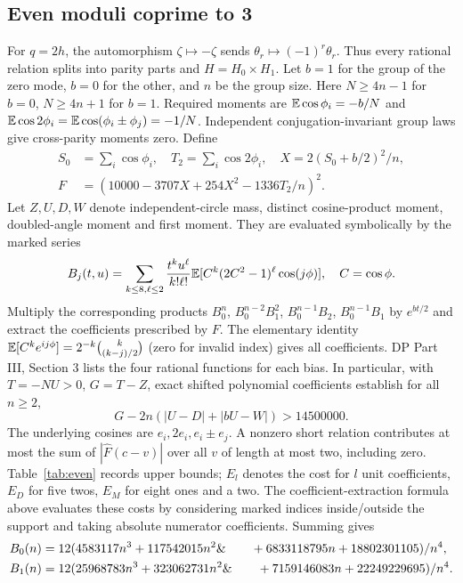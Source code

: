 \documentclass[11pt]{article}
\begin{document}
\subsection{Even moduli coprime to 3}
For $q=2h$, the automorphism $\zeta\mapsto-\zeta$ sends $\theta_r\mapsto(-1)^r\theta_r$. Thus every rational relation splits into parity parts and $H=H_0\times H_1$. Let $b=1$ for the group of the zero mode, $b=0$ for the other, and $n$ be the group size. Here $N\ge4n-1$ for $b=0$, $N\ge4n+1$ for $b=1$. Required moments are $\mathbb E\cos\phi_i=-b/N$ and $\mathbb E\cos2\phi_i=\mathbb E\cos(\phi_i\pm\phi_j)=-1/N$. Independent conjugation-invariant group laws give cross-parity moments zero. Define
\begin{align}S_0&=\sum_i\cos\phi_i,\quad T_2=\sum_i\cos2\phi_i,\quad X=2(S_0+b/2)^2/n,\\F&=(10000-3707X+254X^2-1336T_2/n)^2.\end{align}
Let $Z,U,D,W$ denote independent-circle mass, distinct cosine-product moment, doubled-angle moment and first moment. They are evaluated symbolically by the marked series
\[B_j(t,u)=\sum_{k\le8,\ell\le2}\frac{t^ku^\ell}{k!\ell!}\mathbb E[C^k(2C^2-1)^\ell\cos(j\phi)],\quad C=\cos\phi.\]
Multiply the corresponding products $B_0^n$, $B_0^{n-2}B_1^2$, $B_0^{n-1}B_2$, $B_0^{n-1}B_1$ by $e^{bt/2}$ and extract the coefficients prescribed by $F$. The elementary identity $\mathbb E[C^ke^{ij\phi}]=2^{-k}\binom{k}{(k-j)/2}$ (zero for invalid index) gives all coefficients. DP Part III, Section 3 lists the four rational functions for each bias. In particular, with $T=-NU>0$, $G=T-Z$, exact shifted polynomial coefficients establish for all $n\ge2$,
\begin{equation}\label{eq:evenbase}G-2n(|U-D|+|bU-W|)>14500000.\end{equation}
The underlying cosines are $e_i,2e_i,e_i\pm e_j$. A nonzero short relation contributes at most the sum of $|\widehat F(c-v)|$ over all $v$ of length at most two, including zero. Table~\ref{tab:even} records upper bounds; $E_l$ denotes the cost for $l$ unit coefficients, $E_D$ for five twos, $E_M$ for eight ones and a two. The coefficient-extraction formula above evaluates these costs by considering marked indices inside/outside the support and taking absolute numerator coefficients. Summing gives
\begin{align}B_0(n)&=12(4583117 n^3+117542015 n^2\&\qquad+6833118795 n+18802301105)/n^4,\notag\\B_1(n)&=12(25968783 n^3+323062731 n^2\&\qquad+7159146083 n+22249229695)/n^4.\notag\end{align}
\end{document}
